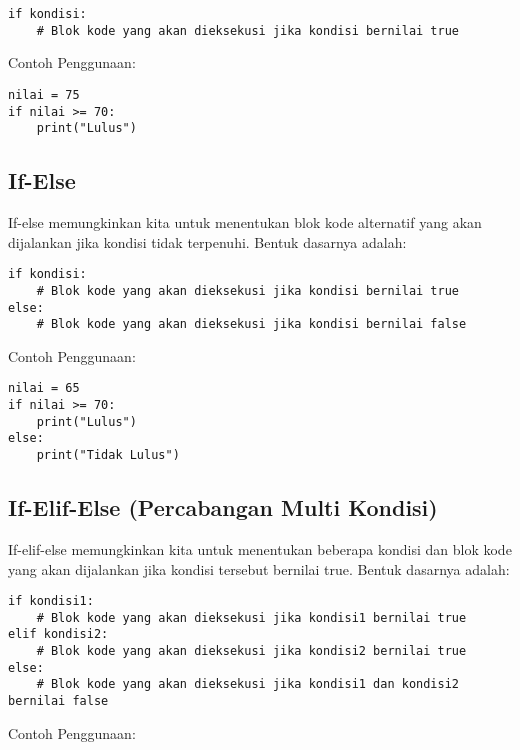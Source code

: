 \begin{lstlisting}[style=PythonStyle, caption={Bentuk dasar if}]
if kondisi:
    # Blok kode yang akan dieksekusi jika kondisi bernilai true
\end{lstlisting}

Contoh Penggunaan:

\begin{lstlisting}[style=PythonStyle, caption={Kode Python: if_statement.py}]
nilai = 75
if nilai >= 70:
    print("Lulus")
\end{lstlisting}

\subsection{If-Else}
If-else memungkinkan kita untuk menentukan blok kode alternatif yang akan dijalankan jika kondisi tidak terpenuhi. Bentuk dasarnya adalah:

\begin{lstlisting}[style=PythonStyle, caption={Bentuk dasar if-else}]
if kondisi:
    # Blok kode yang akan dieksekusi jika kondisi bernilai true
else:
    # Blok kode yang akan dieksekusi jika kondisi bernilai false
\end{lstlisting}

Contoh Penggunaan:

\begin{lstlisting}[style=PythonStyle, caption={Kode Python: if_else_statement.py}]
nilai = 65
if nilai >= 70:
    print("Lulus")
else:
    print("Tidak Lulus")
\end{lstlisting}

\subsection{If-Elif-Else (Percabangan Multi Kondisi)}
If-elif-else memungkinkan kita untuk menentukan beberapa kondisi dan blok kode yang akan dijalankan jika kondisi tersebut bernilai true. Bentuk dasarnya adalah:

\begin{lstlisting}[style=PythonStyle, caption={Bentuk dasar if-elif-else}]
if kondisi1:
    # Blok kode yang akan dieksekusi jika kondisi1 bernilai true
elif kondisi2:
    # Blok kode yang akan dieksekusi jika kondisi2 bernilai true
else:
    # Blok kode yang akan dieksekusi jika kondisi1 dan kondisi2 bernilai false
\end{lstlisting}

Contoh Penggunaan:


